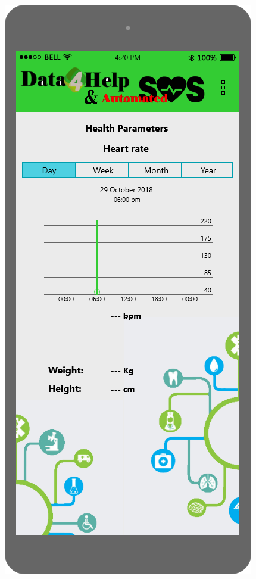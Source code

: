 \begin{figure}[h!]
	\centering
 	\begin{minipage}[b]{0.25\textwidth}
    		\includegraphics[width=\textwidth]{./pictures/health_param.png}

\end{minipage}
\end{figure}
